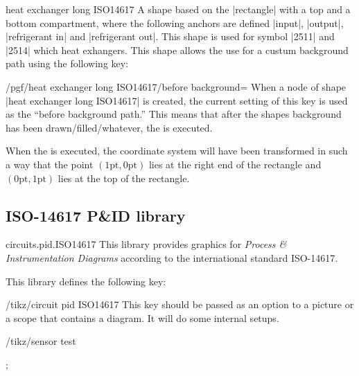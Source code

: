 \documentclass[a4paper]{ltxdoc}
\begin{document}
\begin{shape}{heat exchanger long ISO14617}
 A shape based on the |rectangle| with a top and a bottom compartment, where the following anchors are defined |input|, |output|, |refrigerant in| and |refrigerant out|. This shape is used for symbol |2511| and |2514| which heat exhangers.
 This shape allows the use for a custum background path using the following key:
 \begin{key}{/pgf/heat exchanger long ISO14617/before background=}
  When a node of shape |heat exchanger long ISO14617| is created, the current
  setting of this key is used as the ``before background path.''
  This means that after the shapes background has been
  drawn/filled/whatever, the  is executed.

  When the  is executed, the coordinate system will have
  been transformed in such a way that the point
  $(1\mathrm{pt},0\mathrm{pt})$ lies at the right end of the rectangle
  and $(0\mathrm{pt},1\mathrm{pt})$ lies at the top of the
  rectangle.
 \end{key}

 \begin{codeexample}[]
 \end{codeexample}
\end{shape}

\subsection{ISO-14617 P\&ID library}
\begin{tikzlibrary}{circuits.pid.ISO14617}
 This library provides graphics for \emph{Process \& Instrumentation Diagrams} according to the international standard ISO-14617.

 \noindent This library defines the following key:

 \begin{key}{/tikz/circuit pid ISO14617}
  This key should be passed as an option to a picture or a scope that contains a diagram. It will do some internal setups.
 \end{key}

 \begin{key}{/tikz/sensor}
  test 
  \begin{codeexample}[]
    \node [sensor={info=center:W}] {};
  \end{codeexample}
 \end{key}

\end{tikzlibrary}
\end{document}
